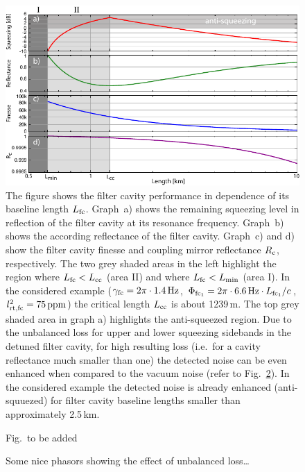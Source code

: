 \begin{figure}
\centering
\includegraphics [scale = 1.1]{./Sec_Optics/FCslength75ppmAI.pdf}
\caption{The figure shows the filter cavity performance in dependence of its baseline length $L_{\rm fc}$. Graph~a) shows the remaining squeezing level in reflection of the filter cavity at its resonance frequency. Graph~b) shows the according  reflectance of the filter cavity. Graph~c) and d) show the filter cavity finesse and coupling mirror reflectance $R_{\rm c}$, respectively. The two grey shaded areas in the left highlight the region where $L_{\rm fc}<L_{\rm cc}$ (area II) and where $L_{\rm fc}<L_{\rm min}$ (area I). In the considered example ($\gamma_{\rm fc} =2\pi\cdot1.4\,{\rm Hz}$, $\Phi_{\rm fc_1}= 2\pi\cdot6.6\,{\rm Hz}\cdot L_{\rm fc_1}/c$,  $l^2_{\rm rt,fc}=75\,{\rm ppm}$) the critical length $L_{\rm cc}$ is about 1239\,m. The top grey shaded area in graph a) highlights the anti-squeezed region. Due to the unbalanced loss for upper and lower squeezing sidebands in the detuned filter cavity, for high resulting loss (i.e.\ for a cavity reflectance much smaller than one) the detected noise can be even enhanced when compared to the vacuum noise (refer to Fig.~\ref{fig:sqzphspic}). In the considered example the detected noise is already enhanced (anti-squuezed) for filter cavity baseline lengths smaller than approximately 2.5\,km.}
\label{fig:length}
\end{figure}



\begin{figure}
\centering
Fig.\ to be added%
\caption{Some nice phasors showing the effect of unbalanced loss\dots}
\label{fig:sqzphspic}
\end{figure}


